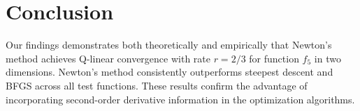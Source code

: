 \documentclass[11pt,a4paper]{article}
\begin{document}
\section{Conclusion}

Our findings demonstrates both theoretically and empirically that Newton's method achieves Q-linear convergence with rate $r=2/3$ for function $f_5$ in two dimensions. Newton's method consistently outperforms steepest descent and BFGS across all test functions. These results confirm the advantage of incorporating second-order derivative information in the optimization algorithms.
\end{document}
